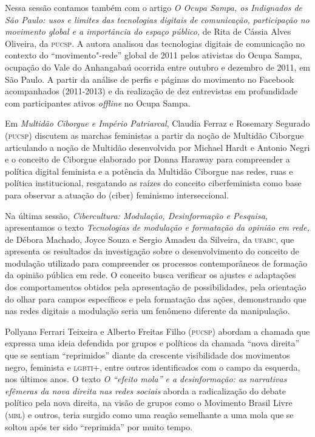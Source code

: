 Nessa sessão contamos também com o artigo \emph{O Ocupa Sampa, os
Indignados de São Paulo: usos e limites das tecnologias digitais de
comunicação, participação no movimento global e a importância do espaço
público,} de Rita de Cássia Alves Oliveira, da \textsc{pucsp}. A autora analisou
das tecnologias digitais de comunicação no contexto do
``movimento"-rede'' global de 2011 pelos ativistas do Ocupa Sampa,
ocupação do Vale do Anhangabaú ocorrida entre outubro e dezembro de
2011, em São Paulo. A partir da análise de perfis e páginas do movimento
no Facebook acompanhados (2011-2013) e da realização de dez entrevistas
em profundidade com participantes ativos \emph{offline} no Ocupa Sampa.

Em \emph{Multidão Ciborgue e Império Patriarcal}, Claudia Ferraz e
Rosemary Segurado (\textsc{pucsp}) discutem as marchas feministas a partir da
noção de Multidão Ciborgue articulando a noção de Multidão desenvolvida
por Michael Hardt e Antonio Negri e o conceito de Ciborgue elaborado por
Donna Haraway para compreender a política digital feminista e a
potência da Multidão Ciborgue nas redes, ruas e política institucional,
resgatando as raízes do conceito ciberfeminista como base para observar
a atuação do (ciber) feminismo interseccional.

Na última sessão, \emph{Cibercultura: Modulação, Desinformação e
Pesquisa,} apresentamos o texto \emph{Tecnologias de modulação e
formatação da opinião em rede,} de Débora Machado, Joyce Souza e Sergio
Amadeu da Silveira, da \textsc{ufabc}, que apresenta os resultados da
investigação sobre o desenvolvimento do conceito de modulação utilizado
para compreender os processos contemporâneos de formação da opinião
pública em rede. O conceito busca verificar os ajustes e adaptações dos
comportamentos obtidos pela apresentação de possibilidades, pela
orientação do olhar para campos específicos e pela formatação das ações,
demonstrando que nas redes digitais a modulação seria um fenômeno
diferente da manipulação.

Pollyana Ferrari Teixeira e Alberto Freitas Filho (\textsc{pucsp}) abordam a
chamada que expressa uma ideia defendida por grupos e políticos da
chamada ``nova direita'' que se sentiam ``reprimidos'' diante da
crescente visibilidade dos movimentos negro, feminista e \textsc{lgbti}+, entre
outros identificados com o campo da esquerda, nos últimos anos. O texto
\emph{O ``efeito mola'' e a desinformação: as narrativas efêmeras da
nova direita nas redes sociais} aborda a radicalização do debate
político pela nova direita, na visão de grupos como o Movimento Brasil
Livre (\textsc{mbl}) e outros, teria surgido como uma reação semelhante a uma
mola que se soltou após ter sido ``reprimida'' por muito tempo.

